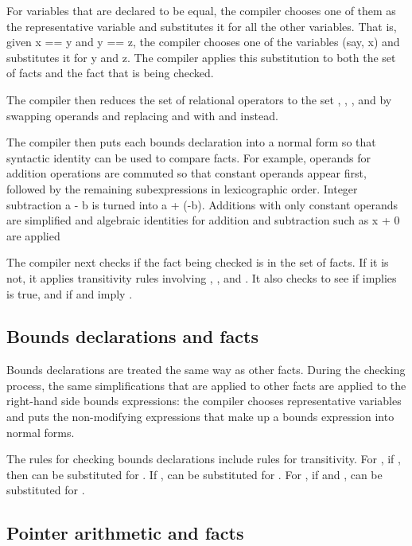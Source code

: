 For variables that are declared to be equal, the compiler chooses one of
them as the representative variable and substitutes it for all the other
variables. That is, given x == y and y == z, the compiler chooses one of
the variables (say, x) and substitutes it for y and z. The compiler
applies this substitution to both the set of facts and the fact that is
being checked.

The compiler then reduces the set of relational operators to the set
\code{<}, \code{<=}, \code{==}, and \code{!=}
by swapping operands and replacing \code{>} and \code{>=} 
with \code{<=} and \code{<} instead.

The compiler then puts each bounds declaration into a normal form so
that syntactic identity can be used to compare facts. For example,
operands for addition operations are commuted so that constant operands
appear first, followed by the remaining subexpressions in lexicographic
order. Integer subtraction a - b is turned into a + (-b). Additions
with only constant operands are simplified and algebraic identities for
addition and subtraction such as x + 0 are applied

The compiler next checks if the fact being checked is in the set of
facts. If it is not, it applies transitivity rules involving
\code{<}, \code{<=}, and \code{==}.
It also checks to see if \code{<}
implies \code{!=} is true, and if \code{<=} and
\code{>=} imply \code{==}.

\subsection{Bounds declarations and facts}

Bounds declarations are treated the same way as other facts. During the
checking process, the same simplifications that are applied to other
facts are applied to the right-hand side bounds expressions: the
compiler chooses representative variables and puts the non-modifying
expressions that make up a bounds expression into normal forms.

The rules for checking bounds declarations include rules for
transitivity. For , if
 \code{<=} , then  can
be substituted for . 
If  \code{<=} ,  can be substituted for
.  For , if
 \code{<=}  and  ,
 can be substituted for .

\subsection{Pointer arithmetic and facts}

